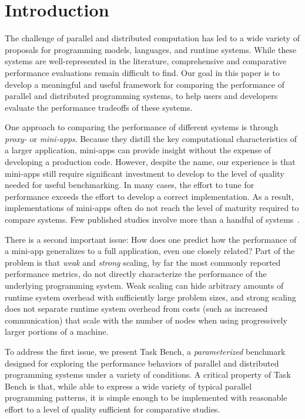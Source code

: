 \section{Introduction}
\label{sec:introduction}

The challenge of parallel and distributed computation has led to a
wide variety of proposals for programming models, languages, and
runtime systems. While these systems are well-represented in the literature, comprehensive and comparative performance evaluations
remain difficult to find. Our
goal in this paper is to develop a meaningful and useful framework for
comparing the performance of parallel and distributed programming
systems, to help users and developers evaluate the performance tradeoffs of these systems.

One approach to comparing the performance of different systems is through \emph{proxy-} or
\emph{mini-apps}. Because they distill the key computational characteristics of a larger
application, mini-apps can provide insight
without the expense of developing a production code. However, despite the name, our experience is that
mini-apps still require significant investment to develop
to the level of quality needed for useful benchmarking. In many cases,
the effort to tune for performance exceeds the effort to develop a correct implementation. As a result, implementations of mini-apps
often do not reach the level of maturity required to compare
systems. Few published studies involve more than a handful of systems~\cite{LULESH13}.

There is a second important issue: How does one predict how
the performance of a mini-app generalizes to a full
application, even one closely related? Part of the problem is
that \emph{weak} and \emph{strong} scaling, by far the most commonly
reported performance metrics,
do not directly characterize the performance of the underlying
programming system. Weak scaling can hide arbitrary amounts of runtime
system overhead with sufficiently large problem sizes, and strong
scaling does not separate runtime system overhead from costs
(such as increased communication) that scale with the number of nodes when
using progressively larger portions of a machine.

To address the first issue, we present Task Bench, a
\emph{parameterized} benchmark designed for exploring the performance
behaviors of parallel and distributed programming systems under a
variety of conditions. A critical property of Task Bench is that,
while able to express a wide variety of typical parallel programming
patterns, it is simple enough to be implemented with reasonable effort
to a level of quality sufficient for comparative studies.

